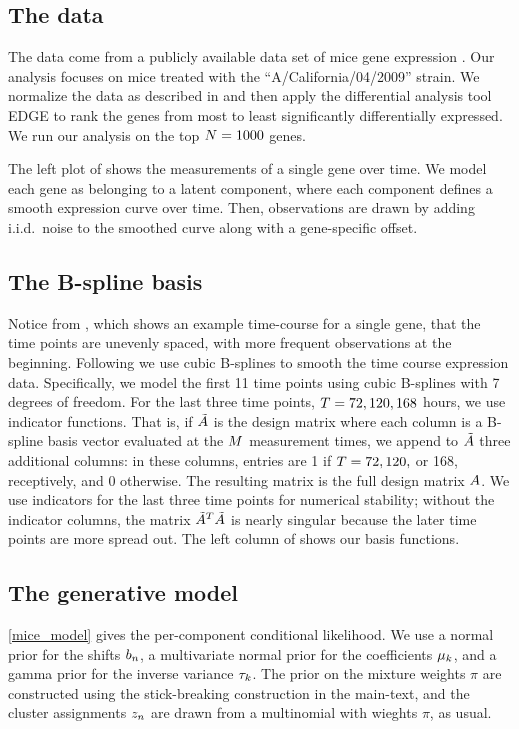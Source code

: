 \subsection{The data}
The data come from a publicly available data set of mice gene expression
\citep{shoemaker:2015:ultrasensitive}.
Our analysis focuses on mice treated with the ``A/California/04/2009'' strain.
We normalize the data as described in
\citet{shoemaker:2015:ultrasensitive} and then apply the differential
analysis tool EDGE \citep{Storey:2005:significance} to rank the genes from most to least significantly differentially expressed.
We run our analysis on the top $N = 1000$ genes.

The left plot of 
shows the measurements of a single gene over time.
We model each gene as belonging to a latent component,
where each component defines a smooth expression curve over time.
Then, observations are drawn by adding i.i.d.\ noise to the smoothed
curve along with a gene-specific offset.

\MiceExampleGenes

\subsection{The B-spline basis}
Notice from , which shows an example time-course for a single gene,
that the time points are unevenly spaced, with more frequent observations at the beginning.
Following \citet{Luan:2003:clustering} we use cubic B-splines to smooth the time course expression data.
Specifically, we model the first 11 time points using
cubic B-splines with 7 degrees of freedom.
For the last three time points, $T = 72, 120, 168$ hours,
we use indicator functions.
That is, if $\tilde {A}$ is the design
matrix where each column is a
B-spline basis vector evaluated at the $M$ measurement times,
we append to $\tilde {A}$ three additional columns:
in these columns, entries are 1
if $T = 72, 120,$ or 168, receptively, and 0 otherwise.
The resulting matrix is the full design matrix $A$.
We use indicators for the last three time points for numerical stability;
without the indicator columns,
the matrix $\tilde {A}^T \tilde {A}$ is nearly singular
because the later time points are more spread out.
The left column of  shows our basis functions.

\subsection{The generative model}
\eqref{mice_model} gives the per-component conditional likelihood.
We use a normal prior for the shifts $b_n$,
a multivariate normal prior for the coefficients $\mu_k$,
and a gamma prior for the inverse variance $\tau_k$.
The prior on the mixture weights $\pi$ are constructed using the stick-breaking
construction in the main-text, and the cluster assignments $z_n$
are drawn from a multinomial with wieghts $\pi$, as usual.



